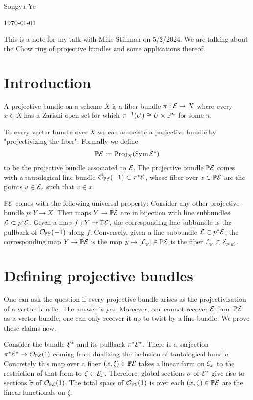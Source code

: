 \documentclass[12pt]{article}
\begin{document}
Songyu Ye

\today

This is a note for my talk with Mike Stillman on 5/2/2024. We are talking about the Chow ring of projective bundles and some
applications thereof.

\section{Introduction}
\begin{definition}
	A projective bundle on a scheme $X$ is a fiber bundle $\pi:\cE\to X$ where every $x\in X$ has a
	Zariski open set for which $\pi^{-1}(U)\cong U\times \P^n$ for some $n$.
\end{definition}

To every vector bundle over $X$ we can associate a projective bundle by
"projectivizing the fiber". Formally we define \begin{align*}
	\P\cE := \Proj_X(\Sym \cE^*)
\end{align*}
to be the projective bundle associated to $\cE$. The projective bundle $\P\cE$
comes with a tautological line bundle $\cO_{\P\cE}(-1) \subset \pi^*\cE$, whose fiber over $x\in \P\cE$
are the points $v\in \cE_x$ such that $v\in x$.

\hfill

$\P\cE$ comes with the following universal property: Consider
any other projective bundle $p:Y\to X$. Then maps $Y\to \P\cE$ are in bijection
with line subbundles $\cL\subset p^*\cE$. Given a map $f:Y\to \P\cE$, the corresponding
line subbundle is the pullback of $\cO_{\P\cE}(-1)$ along $f$. Conversely,
given a line subbundle $\cL\subset p^*\cE$, the corresponding map $Y\to \P\cE$ is the
map $y\mapsto [\cL_y] \in \P\cE$ is the fiber $\cL_y\subset \cE_{p(y)}$.

\section{Defining projective bundles}
One can ask the question if every projective bundle arises as the projectivization of a vector bundle.
The answer is yes. Moreover, one cannot recover $\cE$ from $\P\cE$ as a vector bundle,
one can only recover it up to twist by a line bundle. We prove these claims now.

\hfill

Consider the bundle $\cE^*$ and its pullback $\pi^*\cE^*$. There is a surjection
$\pi^*\cE^*\to \cO_{\P\cE}(1)$ coming from dualizing the inclusion of tautological
bundle. Concretely this map over a fiber $(x,\zeta) \in \P\cE$ takes a linear form on
$\cE_x$ to the restriction of that form to $\zeta\subset \cE_x$. Therefore,
global sections $\sigma$ of $\cE^*$ give rise to sections $\tilde\sigma$
of $\cO_{\P\cE}(1)$. The total space of $\cO_{\P\cE}(1)$ is over each $(x,\zeta)\in \P\cE$
are the linear functionals on $\zeta$.
\end{document}
